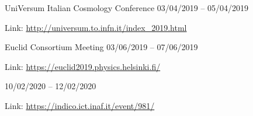 


\begin{cventries}


\cventry
{} %
{UniVersum Italian Cosmology Conference} %
{} %
{03/04/2019 -- 05/04/2019} %
{ %
\begin{cvitems}
\item {}
\item {Link: \url{http://universum.to.infn.it/index_2019.html}}
\end{cvitems}
}


\cventry
{} %
{Euclid Consortium Meeting} %
{} %
{03/06/2019 -- 07/06/2019} %
{ %
\begin{cvitems}
\item {}
\item {Link: \url{https://euclid2019.physics.helsinki.fi/}}
\end{cvitems}
}


\cventry
{} %
{} %
{} %
{10/02/2020 -- 12/02/2020} %
{ %
\begin{cvitems}
\item {}
\item {Link: \url{https://indico.ict.inaf.it/event/981/}}
\end{cvitems}
}



\end{cventries}

